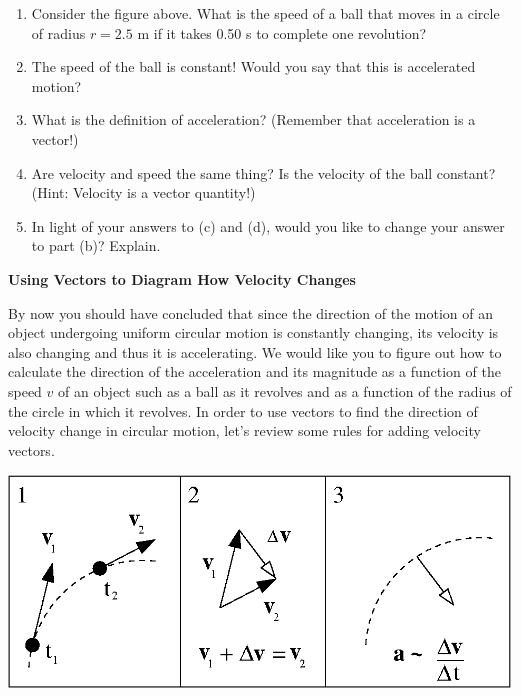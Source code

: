 \begin{enumerate}

\item Consider the figure above. What is the speed of a ball that moves in a circle
of radius $r = 2.5$ m if it takes 0.50 s to complete one revolution?
\vspace{20mm}

\item The speed of the ball is constant! Would you say that this is accelerated
motion?
\vspace{20mm}

\item What is the definition of acceleration? (Remember that acceleration is a
vector!)
\vspace{20mm}

\item Are velocity and speed the same thing? Is the velocity of the ball constant?
(Hint: Velocity is a vector quantity!)
\vspace{20mm}

\item In light of your answers to (c) and (d), would you like to change your answer
to part (b)? Explain.
\vspace{20mm}

\end{enumerate}

\textbf{Using Vectors to Diagram How Velocity Changes} 

By now you should have concluded that since the direction of the motion of an
object undergoing uniform circular motion is constantly changing, its velocity
is also changing and thus it is accelerating. We would like you to figure out
how to calculate the direction of the acceleration and its magnitude as a function
of the speed $v$ of an object such as a ball as it revolves and as a function
of the radius of the circle in which it revolves. In order to use vectors to
find the direction of velocity change in circular motion, let's review some
rules for adding velocity vectors.

\vspace{0.3cm}
{\par\centering \includegraphics{iqsCentripetalForce/circ_motion_fig1b.eps} \par}
\vspace{0.3cm}

